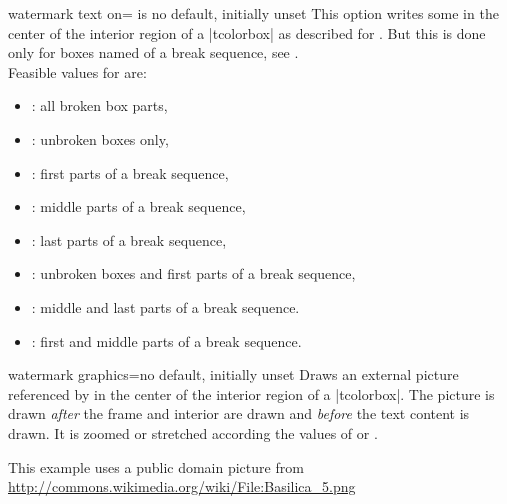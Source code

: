 \begin{docTcbKey}{watermark text on}{= is }{no default, initially unset}
  This option writes some  in the center of the interior region of a |tcolorbox|
  as described for .
  But this is done only for boxes named  of a break sequence, see
  .\\ 
  Feasible values for  are:
  \begin{itemize}
  \item{}: all broken box parts,
  \item{}: unbroken boxes only,
  \item{}: first parts of a break sequence,
  \item{}: middle parts of a break sequence,
  \item{}: last parts of a break sequence,
  \item{}: unbroken boxes and first parts of a break sequence,
  \item{}: middle and last parts of a break sequence.
  \item{}: first and middle parts of a break sequence.
  \end{itemize}
\end{docTcbKey}


\clearpage


\begin{docTcbKey}{watermark graphics}{=}{no default, initially unset}
  Draws an external picture referenced by 
  in the center of the interior region of a |tcolorbox|.
  The picture is drawn \emph{after} the
  frame and interior are drawn and \emph{before} the text content is drawn.
  It is zoomed or stretched according the values of
   or .
\begin{dispExample}

\begin{tcolorbox}[enhanced,title=My title,watermark graphics=Basilica_5.png,
  watermark opacity=0.15]
\lipsum[1-2]
\tcblower
This example uses a public domain picture from\\
\url{http://commons.wikimedia.org/wiki/File:Basilica_5.png}
\end{tcolorbox}
\end{dispExample}
\end{docTcbKey}


